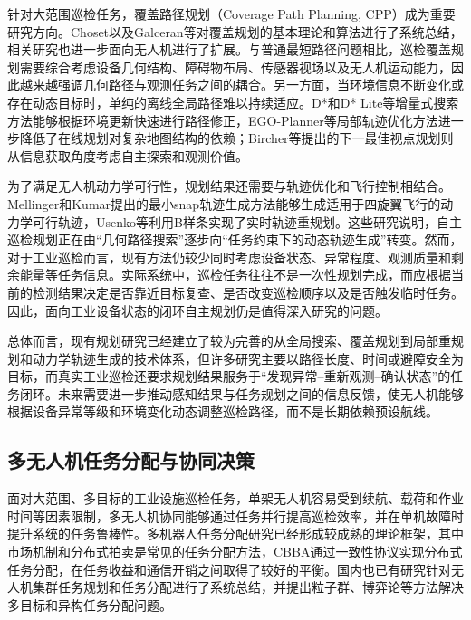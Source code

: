 针对大范围巡检任务，覆盖路径规划（Coverage Path Planning, CPP）成为重要研究方向。Choset以及Galceran等对覆盖规划的基本理论和算法进行了系统总结\cite{choset2001coverage,galceran2013survey}，相关研究也进一步面向无人机进行了扩展。与普通最短路径问题相比，巡检覆盖规划需要综合考虑设备几何结构、障碍物布局、传感器视场以及无人机运动能力，因此越来越强调几何路径与观测任务之间的耦合。另一方面，当环境信息不断变化或存在动态目标时，单纯的离线全局路径难以持续适应。D*和D* Lite等增量式搜索方法能够根据环境更新快速进行路径修正\cite{stentz1994optimal,koenig2002d}，EGO-Planner等局部轨迹优化方法进一步降低了在线规划对复杂地图结构的依赖\cite{zhou2022ego}；Bircher等提出的下一最佳视点规划则从信息获取角度考虑自主探索和观测价值\cite{bircher2016receding}。

为了满足无人机动力学可行性，规划结果还需要与轨迹优化和飞行控制相结合。Mellinger和Kumar提出的最小snap轨迹生成方法能够生成适用于四旋翼飞行的动力学可行轨迹\cite{mellinger2011minimum}，Usenko等利用B样条实现了实时轨迹重规划\cite{usenko2017real}。这些研究说明，自主巡检规划正在由“几何路径搜索”逐步向“任务约束下的动态轨迹生成”转变。然而，对于工业巡检而言，现有方法仍较少同时考虑设备状态、异常程度、观测质量和剩余能量等任务信息。实际系统中，巡检任务往往不是一次性规划完成，而应根据当前的检测结果决定是否靠近目标复查、是否改变巡检顺序以及是否触发临时任务。因此，面向工业设备状态的闭环自主规划仍是值得深入研究的问题。

总体而言，现有规划研究已经建立了较为完善的从全局搜索、覆盖规划到局部重规划和动力学轨迹生成的技术体系，但许多研究主要以路径长度、时间或避障安全为目标，而真实工业巡检还要求规划结果服务于“发现异常--重新观测--确认状态”的任务闭环。未来需要进一步推动感知结果与任务规划之间的信息反馈，使无人机能够根据设备异常等级和环境变化动态调整巡检路径，而不是长期依赖预设航线。

\subsection{多无人机任务分配与协同决策}

面对大范围、多目标的工业设施巡检任务，单架无人机容易受到续航、载荷和作业时间等因素限制，多无人机协同能够通过任务并行提高巡检效率，并在单机故障时提升系统的任务鲁棒性。多机器人任务分配研究已经形成较成熟的理论框架\cite{gerkey2004formal}，其中市场机制和分布式拍卖是常见的任务分配方法，CBBA通过一致性协议实现分布式任务分配，在任务收益和通信开销之间取得了较好的平衡\cite{choi2009consensus}。国内也已有研究针对无人机集群任务规划和任务分配进行了系统总结，并提出粒子群、博弈论等方法解决多目标和异构任务分配问题\cite{jiagw2021review,duyh2020survey,jiayn2020recent,zhaiz2023market,zhangrp2022hybrid,jukai2022task}。

